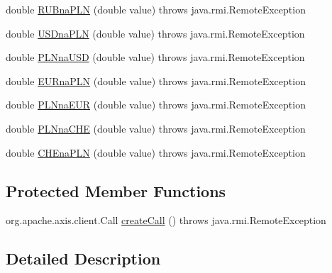 \begin{DoxyCompactItemize}
\item 
double \hyperlink{classkantor_1_1com_1_1web_1_1service_1_1_kantor_przelicz_soap_binding_stub_a808bb2077397435895bf2fd9bf38d6c7}{R\+U\+Bna\+P\+L\+N} (double value)  throws java.\+rmi.\+Remote\+Exception 
\item 
double \hyperlink{classkantor_1_1com_1_1web_1_1service_1_1_kantor_przelicz_soap_binding_stub_a16867679e15bceab605c16b1b20ff89d}{U\+S\+Dna\+P\+L\+N} (double value)  throws java.\+rmi.\+Remote\+Exception 
\item 
double \hyperlink{classkantor_1_1com_1_1web_1_1service_1_1_kantor_przelicz_soap_binding_stub_a62a18092ec91b3391244ff5e678186ec}{P\+L\+Nna\+U\+S\+D} (double value)  throws java.\+rmi.\+Remote\+Exception 
\item 
double \hyperlink{classkantor_1_1com_1_1web_1_1service_1_1_kantor_przelicz_soap_binding_stub_a1ca4bcdbf6b3301c515be2ddb81a7689}{E\+U\+Rna\+P\+L\+N} (double value)  throws java.\+rmi.\+Remote\+Exception 
\item 
double \hyperlink{classkantor_1_1com_1_1web_1_1service_1_1_kantor_przelicz_soap_binding_stub_a889d3a09409acf8888638c2dce6ea86f}{P\+L\+Nna\+E\+U\+R} (double value)  throws java.\+rmi.\+Remote\+Exception 
\item 
double \hyperlink{classkantor_1_1com_1_1web_1_1service_1_1_kantor_przelicz_soap_binding_stub_a998215c43de5fc4a9f9cb3300347761a}{P\+L\+Nna\+C\+H\+E} (double value)  throws java.\+rmi.\+Remote\+Exception 
\item 
double \hyperlink{classkantor_1_1com_1_1web_1_1service_1_1_kantor_przelicz_soap_binding_stub_a95c3905cd703617b5c0355134546befc}{C\+H\+Ena\+P\+L\+N} (double value)  throws java.\+rmi.\+Remote\+Exception 
\end{DoxyCompactItemize}
\subsection*{Protected Member Functions}
\begin{DoxyCompactItemize}
\item 
org.\+apache.\+axis.\+client.\+Call \hyperlink{classkantor_1_1com_1_1web_1_1service_1_1_kantor_przelicz_soap_binding_stub_a48bdf944c0e7affdc54748a99e024768}{create\+Call} ()  throws java.\+rmi.\+Remote\+Exception 
\end{DoxyCompactItemize}


\subsection{Detailed Description}


